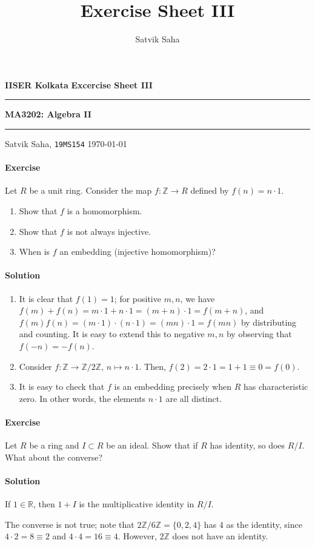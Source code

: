\documentclass[10pt]{article}
\title{Exercise Sheet III}
\author{Satvik Saha}
\date{}
\newcounter{prob}
\newcommand{\problem}{\stepcounter{prob}\paragraph{Exercise \arabic{prob}}}
\newcommand{\solution}{\paragraph{Solution}}
\newcommand{\R}{\mathbb{R}}
\newcommand{\Z}{\mathbb{Z}}
\begin{document}
    \noindent\textbf{IISER Kolkata} \hfill \textbf{Excercise Sheet III}
    \vspace{3pt}
    \hrule
    \vspace{3pt}
    \begin{center}
    \LARGE{\textbf{MA3202: Algebra II}}
    \end{center}
    \vspace{3pt}
    \hrule
    \vspace{3pt}
    Satvik Saha, \texttt{19MS154} \hfill \today
    \vspace{20pt}

    \problem Let $R$ be a unit ring. Consider the map $f\colon \Z \to R$ defined by
    $f(n) = n\cdot 1$. \begin{enumerate}
        \itemsep0em
        \item Show that $f$ is a homomorphism.
        \item Show that $f$ is not always injective.
        \item When is $f$ an embedding (injective homomorphism)?
    \end{enumerate}

    \solution \mbox{}
    \begin{enumerate}
        \item It is clear that $f(1) = 1$; for positive $m, n$, we have $f(m) + f(n) =
        m\cdot 1 + n\cdot 1 = (m + n)\cdot 1 = f(m + n)$, and $f(m)f(n) = (m\cdot 1)
        \cdot (n \cdot 1) = (mn)\cdot 1 = f(mn)$ by distributing and counting. It is
        easy to extend this to negative $m, n$ by observing that $f(-n) = -f(n)$.

        \item Consider $f\colon \Z \to \Z/2\Z$, $n \mapsto n\cdot 1$. Then, $f(2) =
        2\cdot 1 = 1 + 1 \equiv 0 = f(0)$.

        \item It is easy to check that $f$ is an embedding precisely when $R$ has
        characteristic zero. In other words, the elements $n\cdot 1$ are all
        distinct.
    \end{enumerate}


    \problem Let $R$ be a ring and $I \subset R$ be an ideal. Show that if $R$ has
    identity, so does $R/I$. What about the converse?

    \solution If $1 \in \R$, then $1 + I$ is the multiplicative identity in $R/I$.

    The converse is not true; note that $2\Z / 6\Z = \{0, 2, 4\}$ has $4$ as the
    identity, since $4\cdot 2 = 8 \equiv 2$ and $4\cdot 4 = 16 \equiv 4$. However,
    $2\Z$ does not have an identity.
\end{document}
